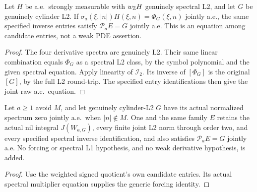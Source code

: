 \begin{lemma}
\label{lem:cylinder-candidate-equation}
\leanok
Let $H$ be a.e.\ strongly measurable with $w_{\mathbb{Z}}H$ genuinely spectral L2,
and let $G$ be genuinely cylinder L2.
If $\sigma_a(\xi,|n|)H(\xi,n)=\Phi_G(\xi,n)$ jointly a.e., the same specified
inverse entries satisfy $\mathcal P_aE=G$ jointly a.e.
This is an equation among candidate entries, not a weak PDE assertion.
\end{lemma}

\begin{proof}
\leanok
The four derivative spectra are genuinely L2. Their same linear combination
equals $\Phi_G$ as a spectral L2 class, by the symbol polynomial and the given
spectral equation. Apply linearity of $\mathcal I_2$.
Its inverse of $[\Phi_G]$ is the original $[G]$, by the full L2 round-trip.
The specified entry identifications then give the joint raw a.e.\ equation.
\end{proof}

\begin{lemma}
\label{lem:cylinder-signed-candidate-equation}
\leanok
Let $a\ge1$ avoid $M$, and let genuinely cylinder-L2 $G$ have its actual
normalized spectrum zero jointly a.e.\ when $|n|\notin M$.
One and the same family $E$ retains the actual nil integral $J(W_{a,G})$,
every finite joint L2 norm through order two, and every specified
spectral inverse identification, and also satisfies $\mathcal P_aE=G$ jointly a.e.
No forcing or spectral L1 hypothesis, and no weak derivative hypothesis, is added.
\end{lemma}

\begin{proof}
\leanok
Use the weighted signed quotient's own candidate entries.
Its actual spectral multiplier equation supplies the generic forcing identity.
\end{proof}

